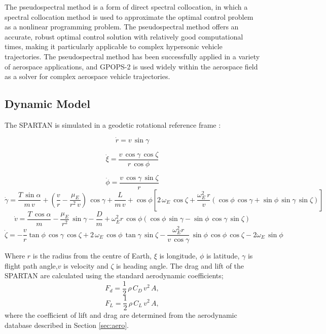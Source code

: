 \documentclass[journal]{new-aiaa} %
\begin{document}
The pseudospectral method is a form of direct spectral collocation, in which a spectral collocation method is used to approximate the optimal control problem as a nonlinear programming problem. The pseudospectral method offers an accurate, robust optimal control solution with relatively good computational times\cite{Fahroo2000,Ross2004}, making it particularly applicable to complex hypersonic vehicle trajectories.  The pseudospectral method has been successfully applied in a variety of aerospace applications, and GPOPS-2 is used widely within the aerospace field as a solver for complex aerospace vehicle trajectories.


\subsection{Dynamic Model}

The SPARTAN is simulated in a geodetic rotational reference frame \cite{Josselyn2002a}: 

\begin{equation}
\dot{r} = v \, \sin \gamma
\end{equation}

\begin{equation}
\dot{\xi} = \frac{v \, \cos \gamma \, \cos \zeta}{r \, \cos \phi}
\end{equation}

\begin{equation}
\dot{\phi} = \frac{v\,\cos\gamma\,\sin\zeta}{r}
\end{equation}
\begin{equation}
\dot{\gamma} = \frac{T\,\sin\alpha}{m\,v}+ (\frac{v}{r}-\frac{\mu_E}{r^2 \,v})\,\cos\gamma + \frac{L}{m\,v}
+ \cos\phi[2\,\omega_E\, \cos\zeta + \frac{\omega_E^2\, r}{v}(\cos\phi\,\cos\gamma+\sin\phi\,\sin\gamma\,\sin\zeta)]
\end{equation}
\begin{equation}
\dot{v} = \frac{T\,\cos\alpha}{m}-\frac{\mu_E}{r^2}\,\sin\gamma - \frac{D}{m}
+ \omega_E^2 r\,\cos\phi(\cos\phi\,\sin\gamma-\sin\phi\,\cos\gamma\,\sin\zeta)
\end{equation}
\begin{equation}
\dot{\zeta} = -\frac{v}{r}\tan\phi\,\cos\gamma\,\cos\zeta +2\,\omega_E\,\cos\phi\,\tan\gamma\,\sin\zeta - \frac{\omega_E^2 r}{v\,\cos\gamma}\,\sin\phi \, \cos\phi\,\cos\zeta-2\omega_E\,\sin\phi 
\end{equation}

Where $r$ is the radius from the centre of Earth, $\xi$ is longitude, $\phi$ is latitude, $\gamma$ is flight path angle,$v$ is velocity and $\zeta$ is heading angle. The drag and lift of the SPARTAN are calculated using the standard aerodynamic coefficients;
\begin{equation}
F_d = \frac{1}{2} \, \rho \, C_D \, v^2 \, A ,
\end{equation}
\begin{equation}
F_L = \frac{1}{2} \, \rho \, C_L \, v^2 \, A ,
\end{equation}
where the coefficient of lift and drag are determined from the aerodynamic database described in Section \ref{sec:aero}.
\end{document}
